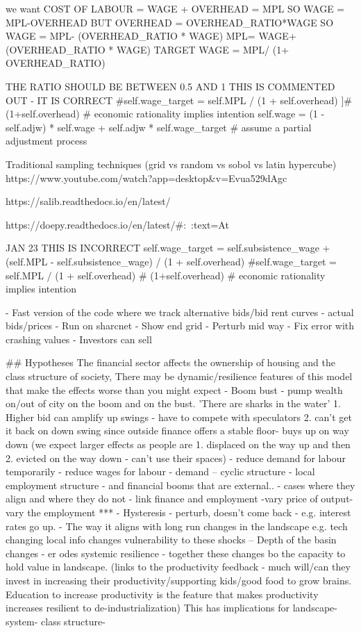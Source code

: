 we want COST OF LABOUR = WAGE + OVERHEAD = MPL 
SO 
WAGE = MPL-OVERHEAD
BUT
OVERHEAD =  OVERHEAD_RATIO*WAGE
SO
WAGE = MPL- (OVERHEAD_RATIO * WAGE)
MPL= WAGE+ (OVERHEAD_RATIO * WAGE)
TARGET WAGE = MPL/ (1+ OVERHEAD_RATIO)

THE RATIO SHOULD BE BETWEEN 0.5 AND 1
THIS IS COMMENTED OUT - IT IS CORRECT
 #self.wage_target = self.MPL / (1 + self.overhead) 
 ]# (1+self.overhead) # economic rationality implies intention
        self.wage = (1 - self.adjw) * self.wage + self.adjw * self.wage_target # assume a partial adjustment process
        



Traditional sampling techniques (grid vs random vs sobol vs latin hypercube)
https://www.youtube.com/watch?app=desktop&v=Evua529dAgc


https://salib.readthedocs.io/en/latest/

https://doepy.readthedocs.io/en/latest/#:~:text=At%



JAN 23
THIS IS INCORRECT
        self.wage_target = self.subsistence_wage + (self.MPL - self.subsistence_wage) / (1 + self.overhead)       #self.wage_target = self.MPL / (1 + self.overhead) # (1+self.overhead) # economic rationality implies intention



- Fast version of the code where we track alternative bids/bid rent curves - actual bids/prices
    - Run on sharcnet
    - Show end grid
- Perturb mid way
- Fix error with crashing values
- Investors can sell

## Hypotheses
The financial sector affects the ownership of housing and the class structure of society, 
There may be dynamic/resilience features of this model that make the effects worse than you might expect
- Boom bust - pump wealth on/out of city on the boom and on the bust. 'There are sharks in the water' 1. Higher bid can amplify up swings - have to compete with speculators 2. can't get it back on down swing since outside finance offers a stable floor- buys up on way down (we expect larger effects as people are 1. displaced on the way up and then 2. evicted on the way down - can't use their spaces)
  - reduce demand for labour temporarily - reduce wages for labour - demand -- cyclic structure - local employment structure - and financial booms that are external.. - cases where they align and where they do not
  - link finance and employment -vary price of output- vary the employment *** 
- Hysteresis - perturb, doesn't come back - e.g. interest rates go up.
- The way it aligns with long run changes in the landscape e.g. tech changing local info changes vulnerability to these shocks -- Depth of the basin changes - er   odes systemic resilience - together these changes bo the capacity to hold value in landscape. (links to the productivity feedback - much will/can they invest in increasing their productivity/supporting kids/good food to grow brains. Education to increase productivity is the feature that makes productivity increases resilient to de-industrialization)
This has implications for landscape- system- class structure- 

